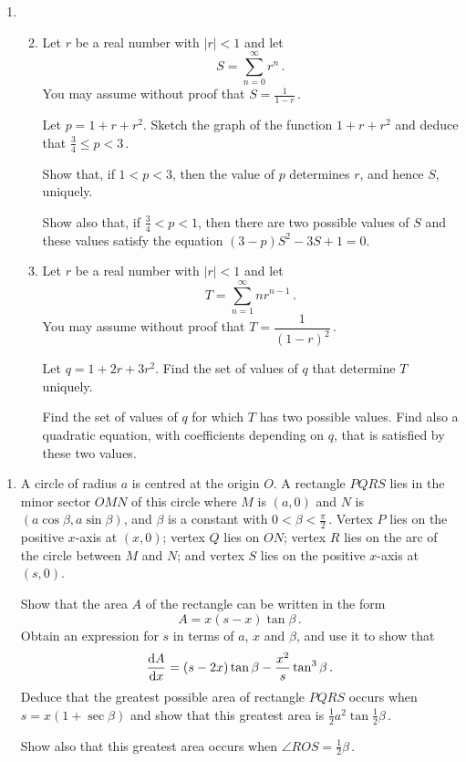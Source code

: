 \documentclass[a4, 11pt]{report}
\newlength{\qspace}
\newcounter{qnumber}
\newenvironment{question}%
 {\vspace{\qspace}
  \begin{enumerate}[\bfseries 1\quad][10]%
    \setcounter{enumi}{\value{qnumber}}%
    \item%
 }
{
  \end{enumerate}
  \filbreak
  \stepcounter{qnumber}
 }
\newenvironment{questionparts}[1][1]%
 {
  \begin{enumerate}[\bfseries (i)]%
    \setcounter{enumii}{#1}
    \addtocounter{enumii}{-1}
    \setlength{\itemsep}{5mm}
    \setlength{\parskip}{8pt}
 }
 {
  \end{enumerate}
 }
\def\d{{\rm d}}
\def\le{\leqslant}
\newcommand{\ds}{\displaystyle}
\begin{document}
\begin{question}
\begin{questionparts}
\item
Let $r$ be a real number with $\vert r \vert<1$ and let 
\[
S = \sum_{n=0}^\infty r^n\,.
\]
 You may assume  without proof 
that $S = \ds \frac{1}{1-r}\, $.



Let $p= 1 + r +r^2$.
Sketch the graph of the function $1+r+r^2$ 
and deduce 
that $\frac{3}{4} \le  p < 3\,$.

Show that,
if $1 <  p < 3$, 
 then the value of $ p$  determines $r$, and hence $S$,
uniquely. 

Show also
that, if $\frac{3}{4} <  p < 1$, then there are two possible values of 
$S$ and these values  satisfy the equation $(3- p)S^2-3S+1=0$.

\item 
Let $r$ be a real number with $\vert r \vert<1$ and let 
\[
T =\sum_{n=1}^\infty nr^{n-1}
\,.
\]
 You may assume without proof that 
$
T = \ds \dfrac{1}{(1-r)^2}\,.
$


Let $ q= 1+2r+3r^2$.
Find the set of values of $ q$ that  determine $T$ uniquely.

Find the set of values of $ q$ 
for which $T$ has two possible values. 
Find also   a quadratic equation,
with coefficients 
depending on $ q$, that is satisfied by these two values.


\end{questionparts}

\end{question}




\begin{question}
A circle of radius $a$
is centred at the origin $O$. A rectangle $PQRS$ lies in the 
minor sector $OMN$ of this circle 
where $M$ is $(a,0)$ and $N$ is $(a \cos \beta, a \sin \beta)$, 
and $\beta$ is a constant with $0 < \beta < \frac{\pi}{2}\,$. 
Vertex $P$ lies on the positive $x$-axis at $(x,0)$; 
vertex $Q$ lies on $ON$; vertex $R$ lies on the arc of the circle 
between $M$ and $N$; and vertex $S$ lies on the positive $x$-axis at $(s,0)$.

Show that the area $A$ of the rectangle can be written in the form
\[
A= x(s-x)\tan\beta
\,.
\]
Obtain an expression for $s$ in terms of $a$, $x$ and $\beta$, and use it to
show  that
\[
\frac{\d A}{\d x} =
(s-2x) \tan \beta  - \frac {x^2} s \tan^3\beta
\,.
\]
Deduce that  the greatest possible area of 
rectangle $PQRS$ occurs when
$s= x(1+\sec\beta)$ and show that this greatest area is $\tfrac12 a^2 \tan \frac12 \beta\,$.

Show also that this greatest area occurs when $\angle ROS = \frac12\beta\,$.

\end{question}
\end{document}
